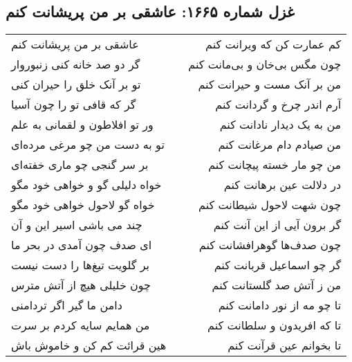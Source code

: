 \begin{center}
\section*{غزل شماره ۱۶۶۵: عاشقی بر من پریشانت کنم}
\label{sec:1665}
\begin{longtable}{l p{0.5cm} r}
عاشقی بر من پریشانت کنم
&&
کم عمارت کن که ویرانت کنم
\\
گر دو صد خانه کنی زنبوروار
&&
چون مگس بی‌خان و بی‌مانت کنم
\\
تو بر آنک خلق را حیران کنی
&&
من بر آنک مست و حیرانت کنم
\\
گر که قافی تو را چون آسیا
&&
آرم اندر چرخ و گردانت کنم
\\
ور تو افلاطون و لقمانی به علم
&&
من به یک دیدار نادانت کنم
\\
تو به دست من چو مرغی مرده‌ای
&&
من صیادم دام مرغانت کنم
\\
بر سر گنجی چو ماری خفته‌ای
&&
من چو مار خسته پیچانت کنم
\\
خواه دلیلی گو و خواهی خود مگو
&&
در دلالت عین برهانت کنم
\\
خواه گو لاحول خواهی خود مگو
&&
چون شهت لاحول شیطانت کنم
\\
چند می باشی اسیر این و آن
&&
گر برون آیی از این آنت کنم
\\
ای صدف چون آمدی در بحر ما
&&
چون صدف‌ها گوهرافشانت کنم
\\
بر گلویت تیغ‌ها را دست نیست
&&
گر چو اسماعیل قربانت کنم
\\
چون خلیلی هیچ از آتش مترس
&&
من ز آتش صد گلستانت کنم
\\
دامن ما گیر اگر تردامنی
&&
تا چو مه از نور دامانت کنم
\\
من همایم سایه کردم بر سرت
&&
تا که افریدون و سلطانت کنم
\\
هین قرائت کم کن و خاموش باش
&&
تا بخوانم عین قرآنت کنم
\\
\end{longtable}
\end{center}
